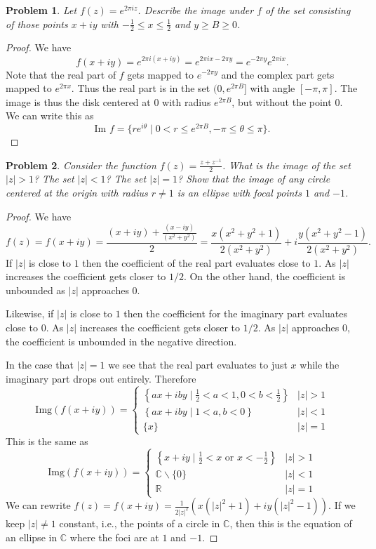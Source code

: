 \documentclass{article}
\newtheorem{problem}{Problem}
\begin{document}
\begin{problem}
Let $f(z) = e^{2 \pi i z}$. Describe the image under $f$ of the set consisting of those points $x+iy$ with $-\frac{1}{2} \leq x \leq \frac{1}{2}$ and $y \geq B \geq 0$.
\end{problem}
\begin{proof}
We have
\[
f(x + iy) = e^{2 \pi i (x+iy)} = e^{2 \pi i x - 2 \pi y} = e^{-2 \pi y} e^{2 \pi i x}.
\]
Note that the real part of $f$ gets mapped to $e^{-2 \pi y}$ and the complex part gets mapped to $e^{2 \pi x}$. Thus the real part is in the set $(0, e^{2 \pi B}]$ with angle $[- \pi, \pi]$. The image is thus the disk centered at $0$ with radius $e^{2 \pi B}$, but without the point $0$. We can write this as
\[
\text{Im } f = \{re^{i \theta} \mid 0 < r \leq e^{2 \pi B}, -\pi \leq \theta \leq \pi\}.
\]
\end{proof}

\begin{problem}
Consider the function $f(z) = \frac{z + z^{-1}}{2}$. What is the image of the set $|z| > 1$? The set $|z| < 1$? The set $|z| = 1$? Show that the image of any circle centered at the origin with radius $r \neq 1$ is an ellipse with focal points $1$ and $-1$.
\end{problem}
\begin{proof}
We have
\[
f(z) = f(x+iy) = \frac{(x+iy) + \frac{(x-iy)}{(x^2+y^2)}}{2} = \frac{x(x^2+y^2+1)}{2(x^2+y^2)} + i \frac{y(x^2+y^2-1)}{2(x^2+y^2)}.
\]
If $|z|$ is close to $1$ then the coefficient of the real part evaluates close to $1$. As $|z|$ increases the coefficient gets closer to $1/2$. On the other hand, the coefficient is unbounded as $|z|$ approaches $0$.

Likewise, if $|z|$ is close to $1$ then the coefficient for the imaginary part evaluates close to $0$. As $|z|$ increases the coefficient gets closer to $1/2$. As $|z|$ approaches $0$, the coefficient is unbounded in the negative direction.

In the case that $|z| = 1$ we see that the real part evaluates to just $x$ while the imaginary part drops out entirely. Therefore
\[
\text{Img}(f(x+iy)) =
\begin{cases}
\left \{ax + iby \mid \frac{1}{2} < a < 1, 0 < b < \frac{1}{2} \right \} & |z| > 1 \\
\left \{ax + iby \mid 1 < a, b < 0 \right \} & |z| < 1 \\
\{x \} & |z| = 1
\end{cases}
\]
This is the same as
\[
\text{Img}(f(x+iy)) =
\begin{cases}
\left \{x + iy \mid \frac{1}{2} < x \text{ or } x < -\frac{1}{2} \right \} & |z| > 1 \\
\mathbb{C} \backslash \{0\} & |z| < 1 \\
\mathbb{R} & |z| = 1
\end{cases}
\]
We can rewrite $f(z) = f(x+iy) = \frac{1}{2|z|^2} (x(|z|^2 + 1) + iy(|z|^2 - 1))$. If we keep $|z| \neq 1$ constant, i.e., the points of a circle in $\mathbb{C}$, then this is the equation of an ellipse in $\mathbb{C}$ where the foci are at $1$ and $-1$.
\end{proof}
\end{document}
